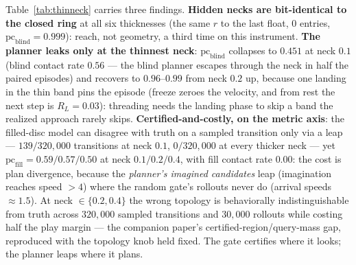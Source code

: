 \documentclass[11pt]{article}
\theoremstyle{remark}
\begin{document}
Table~\ref{tab:thinneck} carries three findings. \textbf{Hidden necks
are bit-identical to the closed
ring} at all six thicknesses (the same $r$ to the last float, $0$
entries, $\mathrm{pc}_{\mathrm{blind}} = 0.999$): reach, not geometry, a
third time on this instrument. \textbf{The planner leaks only at the
thinnest neck}: $\mathrm{pc}_{\mathrm{blind}}$ collapses to $0.451$ at
neck $0.1$ (blind contact rate $0.56$ --- the blind planner escapes
through the neck in half the paired episodes) and recovers to
$0.96$--$0.99$ from neck $0.2$ up, because one landing in the thin band
pins the episode (freeze zeroes the velocity, and from rest the next
step is $R_L = 0.03$): threading needs the landing phase to skip a band
the realized approach rarely skips. \textbf{Certified-and-costly, on the
metric axis}: the filled-disc model can disagree with truth on a sampled
transition only via a leap --- $139/320{,}000$ transitions at neck
$0.1$, $0/320{,}000$ at every thicker neck --- yet
$\mathrm{pc}_{\mathrm{fill}} = 0.59/0.57/0.50$ at neck $0.1/0.2/0.4$,
with fill contact rate $0.00$: the cost is plan divergence, because the
\emph{planner's imagined candidates} leap (imagination reaches speed
$> 4$) where the random gate's rollouts never do (arrival speeds
$\approx 1.5$). At neck $\in \{0.2, 0.4\}$ the wrong topology is
behaviorally indistinguishable from truth across $320{,}000$ sampled
transitions and $30{,}000$ rollouts while costing half the play margin
--- the companion paper's certified-region/query-mass gap, reproduced
with the topology knob held fixed. The gate certifies where it looks;
the planner leaps where it plans.
\end{document}
